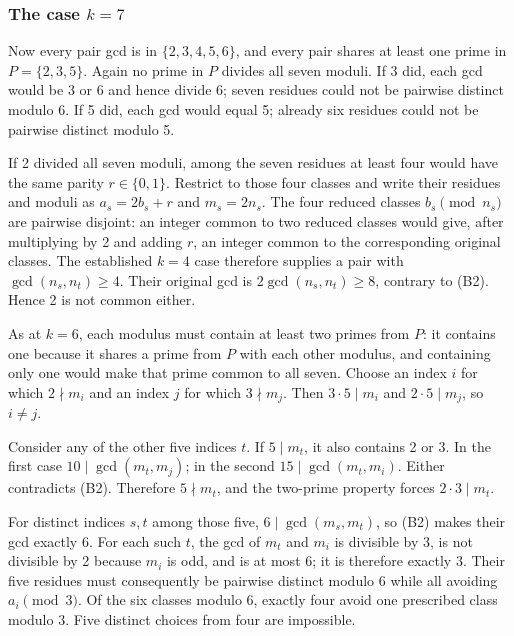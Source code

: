 \documentclass[11pt,a4paper]{article}
\begin{document}
\subsubsection{\texorpdfstring{The case \(k=7\)}{The case k=7}}\label{the-case-k7}

Now every pair gcd is in \(\{2,3,4,5,6\}\), and every pair shares at least one prime in \(P=\{2,3,5\}\). Again no prime in \(P\) divides all seven moduli. If 3 did, each gcd would be 3 or 6 and hence divide 6; seven residues could not be pairwise distinct modulo 6. If 5 did, each gcd would equal 5; already six residues could not be pairwise distinct modulo 5.

If 2 divided all seven moduli, among the seven residues at least four would have the same parity \(r\in\{0,1\}\). Restrict to those four classes and write their residues and moduli as \(a_s=2b_s+r\) and \(m_s=2n_s\). The four reduced classes \(b_s\pmod{n_s}\) are pairwise disjoint: an integer common to two reduced classes would give, after multiplying by 2 and adding \(r\), an integer common to the corresponding original classes. The established \(k=4\) case therefore supplies a pair with \(\gcd(n_s,n_t)\ge4\). Their original gcd is \(2\gcd(n_s,n_t)\ge8\), contrary to (B2). Hence 2 is not common either.

As at \(k=6\), each modulus must contain at least two primes from \(P\): it contains one because it shares a prime from \(P\) with each other modulus, and containing only one would make that prime common to all seven. Choose an index \(i\) for which \(2\nmid m_i\) and an index \(j\) for which \(3\nmid m_j\). Then \(3\cdot5\mid m_i\) and \(2\cdot5\mid m_j\), so \(i\ne j\).

Consider any of the other five indices \(t\). If \(5\mid m_t\), it also contains 2 or 3. In the first case \(10\mid\gcd(m_t,m_j)\); in the second \(15\mid\gcd(m_t,m_i)\). Either contradicts (B2). Therefore \(5\nmid m_t\), and the two-prime property forces \(2\cdot3\mid m_t\).

For distinct indices \(s,t\) among those five, \(6\mid\gcd(m_s,m_t)\), so (B2) makes their gcd exactly 6. For each such \(t\), the gcd of \(m_t\) and \(m_i\) is divisible by 3, is not divisible by 2 because \(m_i\) is odd, and is at most 6; it is therefore exactly 3. Their five residues must consequently be pairwise distinct modulo 6 while all avoiding \(a_i\pmod3\). Of the six classes modulo 6, exactly four avoid one prescribed class modulo 3. Five distinct choices from four are impossible.
\end{document}
